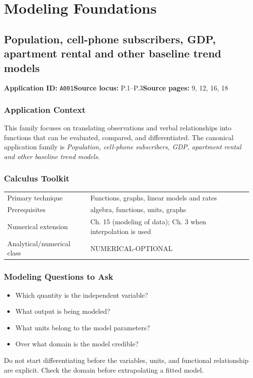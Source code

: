 \documentclass[11pt]{book}
\newcommand{\pid}[1]{\texttt{#1}}
\begin{document}
\part{Modeling Foundations}
\chapter{Population, cell-phone subscribers, GDP, apartment rental and other baseline trend models}\label{app:A001}
\textbf{Application ID:} \pid{A001}\quad \textbf{Source locus:} P.1–P.3\quad \textbf{Source pages:} 9, 12, 16, 18
\section*{Application Context}
This family focuses on translating observations and verbal relationships into functions that can be evaluated, compared, and differentiated. The canonical application family is \emph{Population, cell-phone subscribers, GDP, apartment rental and other baseline trend models}.
\section*{Calculus Toolkit}
\begin{tabularx}{\textwidth}{@{}lX@{}}\toprule
Primary technique & Functions, graphs, linear models and rates \\
Prerequisites & algebra, functions, units, graphs \\
Numerical extension & Ch. 15 (modeling of data); Ch. 3 when interpolation is used \\
Analytical/numerical class & NUMERICAL-OPTIONAL \\
\bottomrule\end{tabularx}
\section*{Modeling Questions to Ask}\begin{itemize}
\item Which quantity is the independent variable?
\item What output is being modeled?
\item What units belong to the model parameters?
\item Over what domain is the model credible?
\end{itemize}
\begin{errorbox}Do not start differentiating before the variables, units, and functional relationship are explicit. Check the domain before extrapolating a fitted model.\end{errorbox}
\end{document}

